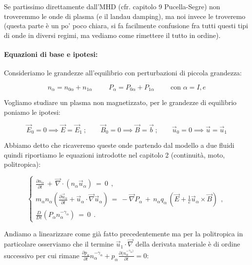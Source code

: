 Se partissimo direttamente dall'MHD (cfr. capitolo 9 Pucella-Segre) non troveremmo le onde di plasma (e il landau damping), ma noi invece le troveremo (questa parte è un po' poco chiara, si fa facilmente confusione fra tutti questi tipi di onde in diversi regimi, ma vediamo come rimettere il tutto in ordine).

  

\paragraph{Equazioni di base e ipotesi: } 

Consideriamo le grandezze all'equilibrio con perturbazioni di piccola grandezza:

\[n_\alpha=n_{0\alpha}+n_{1\alpha}\hspace{1cm}P_\alpha=P_{0\alpha}+P_{1\alpha}\hspace{1cm}\text{con }\alpha=I,e\]

Vogliamo studiare un plasma non magnetizzato, per le grandezze di equilibrio poniamo le ipotesi:

\[\vec E_0=0 \implies \vec E=\vec E_1\ ;\qquad
\vec B_0=0\implies \vec B=\vec b\ ; \qquad
\vec u_0=0\implies \vec u=\vec u_1\] 

Abbiamo detto che ricaveremo queste onde partendo dal modello a due fluidi quindi riportiamo le equazioni introdotte nel capitolo 2 (continuità, moto, politropica):

\[
\begin{cases}
	\frac{\partial n_\alpha}{\partial t}\, +\, \vec \nabla \cdot (n_\alpha \vec u_\alpha)\ =\ 0\ \ ,\\
	m_\alpha n_\alpha \left(\frac{\partial \vec u_\alpha}{\partial t} + \vec u_\alpha \cdot \vec \nabla \vec u_\alpha \right)\ =\ -\vec \nabla P_\alpha\, +\, n_\alpha q_\alpha\,\left(\vec E + \frac{1}{c}\vec u_\alpha \times \vec B\right)\ \ ,\\
	\frac{D}{Dt} \left(P_\alpha n_\alpha^{-\gamma_\alpha}\right)\ =\ 0\ \ .	
\end{cases}
\]

Andiamo a linearizzare come già fatto precedentemente ma per la politropica in particolare osserviamo che il termine $\vec u_1\cdot \vec \nabla$ della derivata materiale è di ordine successivo per cui rimane $\frac{\partial p_\alpha}{\partial t} n_\alpha^{-\gamma_\alpha} + p_\alpha\frac{\partial (n_\alpha^{-\gamma_\alpha)}}{\partial t} = 0$:

